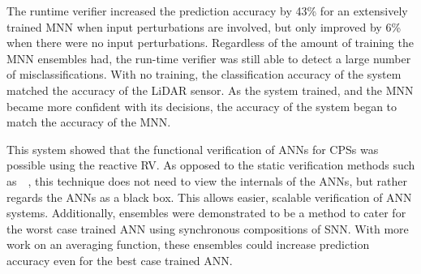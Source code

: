The runtime verifier increased the prediction accuracy by 43\% for an extensively trained \ac{MNN} when input perturbations are involved, but only improved by 6\% when there were no input perturbations.
Regardless of the amount of training the \ac{MNN} ensembles had, the run-time verifier was still able to detect a large number of misclassifications.
With no training, the classification accuracy of the system matched the accuracy of the \ac{LiDAR} sensor.
As the system trained, and the \ac{MNN} became more confident with its decisions, the accuracy of the system began to match the accuracy of the \ac{MNN}.

This system showed that the functional verification of \acp{ANN} for \acp{CPS} was possible using the reactive \ac{RV}. 
As opposed to the static verification methods such as~\cite{Gehr2018AI2SA}~\cite{reluplex}, this technique does not need to view the internals of the \acp{ANN}, but rather regards the \acp{ANN} as a black box.
This allows easier, scalable verification of \ac{ANN} systems.
Additionally, ensembles were demonstrated to be a method to cater for the worst case trained \ac{ANN} using synchronous compositions of \ac{SNN}.
With more work on an averaging function, these ensembles could increase prediction accuracy even for the best case trained \ac{ANN}.








